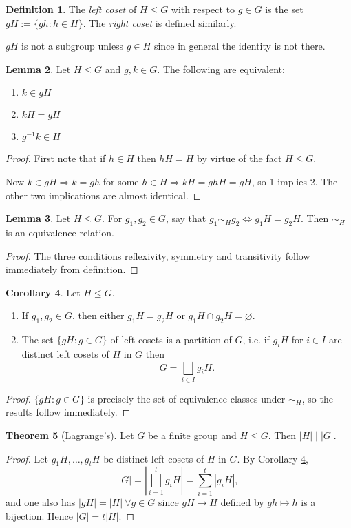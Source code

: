 \documentclass[a4paper]{article}
\theoremstyle{definition}
\newtheorem{defn}{Definition}[subsection]
\newtheorem{thm}[defn]{Theorem}
\newtheorem{lemma}[defn]{Lemma}
\newtheorem{coro}[defn]{Corollary}
\begin{document}
\begin{defn}
The \textit{left coset} of $H\leq G$ with respect to $g\in G$ is the set $gH:=\{gh:h\in H\}.$ The \textit{right coset} is defined similarly.
\end{defn}
$gH$ is not a subgroup unless $g\in H$ since in general the identity is not there.
\begin{lemma}
Let $H\leq G$ and $g,k\in G$. The following are equivalent:
\begin{enumerate}
\item $k\in gH$
\item $kH=gH$
\item $g^{-1}k\in H$
\end{enumerate}
\end{lemma}
\begin{proof}
First note that if $h\in H$ then $hH=H$ by virtue of the fact $H\leq G$.

Now $k\in gH\Rightarrow k=gh$ for some $h\in H \Rightarrow kH=ghH=gH$, so 1 implies 2. The other two implications are almost identical.
\end{proof}
\begin{lemma}
Let $H\leq G$. For $g_1,g_2\in G$, say that $g_1\sim_H g_2\Leftrightarrow g_1H=g_2H$. Then $\sim_H$ is an equivalence relation.
\end{lemma}
\begin{proof}
The three conditions reflexivity, symmetry and transitivity follow immediately from definition.
\end{proof}
\begin{coro}
\label{coro:cosetspartitiongp}
Let $H\leq G$.
\begin{enumerate}
\item If $g_1,g_2\in G$, then either $g_1H=g_2H$ or $g_1H\cap g_2 H=\varnothing$.
\item The set $\{gH:g\in G\}$ of left cosets is a partition of $G$, i.e. if $g_iH$ for $i\in I$ are distinct left cosets of $H$ in $G$ then
\[
G=\bigsqcup_{i\in I} g_i H.
\]
\end{enumerate}
\end{coro}
\begin{proof}
$\{gH:g\in G\}$ is precisely the set of equivalence classes under $\sim_H$, so the results follow immediately.
\end{proof}
\begin{thm}[Lagrange's]
Let $G$ be a finite group and $H\leq G$. Then $|H|\mid |G|$.
\end{thm}
\begin{proof}
Let $g_1H,\ldots,g_tH$ be distinct left cosets of $H$ in $G$. By Corollary \ref{coro:cosetspartitiongp},
\[
|G|=\left|\bigsqcup_{i=1}^t g_i H\right|=\sum_{i=1}^t |g_iH|,
\]
and one also has $|gH|=|H| \ \forall g\in G$ since $gH\rightarrow H$ defined by $gh\mapsto h$ is a bijection. Hence $|G|=t|H|$.
\end{proof}
\end{document}
